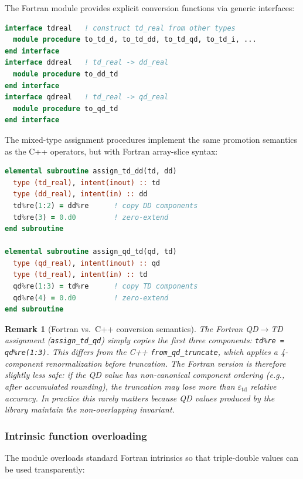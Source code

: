 \documentclass[11pt,a4paper]{article}
\newtheorem{remark}{Remark}
\begin{document}
The Fortran module provides explicit conversion functions via
generic interfaces:
\begin{lstlisting}[language=Fortran]
interface tdreal   ! construct td_real from other types
  module procedure to_td_d, to_td_dd, to_td_qd, to_td_i, ...
end interface
interface ddreal   ! td_real -> dd_real
  module procedure to_dd_td
end interface
interface qdreal   ! td_real -> qd_real
  module procedure to_qd_td
end interface
\end{lstlisting}
The mixed-type assignment procedures implement the same promotion
semantics as the C++ operators, but with Fortran array-slice
syntax:
\begin{lstlisting}[language=Fortran]
elemental subroutine assign_td_dd(td, dd)
  type (td_real), intent(inout) :: td
  type (dd_real), intent(in) :: dd
  td%re(1:2) = dd%re      ! copy DD components
  td%re(3) = 0.d0         ! zero-extend
end subroutine

elemental subroutine assign_qd_td(qd, td)
  type (qd_real), intent(inout) :: qd
  type (td_real), intent(in) :: td
  qd%re(1:3) = td%re      ! copy TD components
  qd%re(4) = 0.d0         ! zero-extend
end subroutine
\end{lstlisting}

\begin{remark}[Fortran vs.\ C++ conversion semantics]
The Fortran QD$\to$TD assignment (\texttt{assign\_td\_qd}) simply
copies the first three components: \texttt{td\%re = qd\%re(1:3)}.
This differs from the C++ \texttt{from\_qd\_truncate}, which
applies a 4-component renormalization before truncation.  The
Fortran version is therefore slightly less safe: if the QD value
has non-canonical component ordering (e.g., after accumulated
rounding), the truncation may lose more than
$\varepsilon_{\mathrm{td}}$ relative accuracy.  In practice this
rarely matters because QD values produced by the library maintain
the non-overlapping invariant.
\end{remark}

\subsubsection{Intrinsic function overloading}

The module overloads standard Fortran intrinsics so that
triple-double values can be used transparently:
\end{document}
